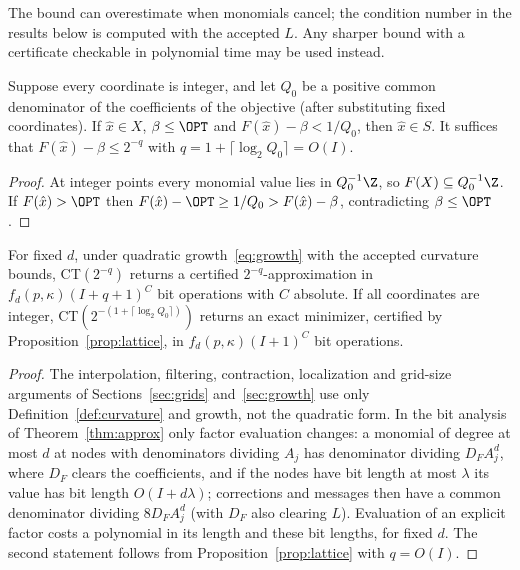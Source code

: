 The bound can overestimate when monomials cancel; the condition number in
the results below is computed with the accepted $L$. Any sharper bound with a
certificate checkable in polynomial time may be used instead.

\begin{proposition}\label{prop:lattice}
Suppose every coordinate is integer, and let $Q_0$ be a positive common
denominator of the coefficients of the objective (after substituting fixed
coordinates). If $\hat x\in X$, $\beta\le\OPT$ and
$F(\hat x)-\beta<1/Q_0$, then $\hat x\in S$. It suffices that
$F(\hat x)-\beta\le2^{-q}$ with $q=1+\lceil\log_2Q_0\rceil=O(I)$.
\end{proposition}

\begin{proof}
At integer points every monomial value lies in $Q_0^{-1}\Z$, so
$F(X)\subseteq Q_0^{-1}\Z$. If $F(\hat x)>\OPT$ then
$F(\hat x)-\OPT\ge1/Q_0>F(\hat x)-\beta$, contradicting $\beta\le\OPT$.
\end{proof}

\begin{corollary}\label{cor:poly}
For fixed $d$, under quadratic growth~\eqref{eq:growth} with the accepted
curvature bounds, CT$(2^{-q})$ returns a certified $2^{-q}$-approximation in
$f_d(p,\kappa)(I+q+1)^{C}$ bit operations with $C$ absolute. If all
coordinates are integer, CT$(2^{-(1+\lceil\log_2Q_0\rceil)})$ returns an exact
minimizer, certified by Proposition~\ref{prop:lattice}, in
$f_d(p,\kappa)(I+1)^C$ bit operations.
\end{corollary}

\begin{proof}
The interpolation, filtering, contraction, localization and grid-size
arguments of Sections~\ref{sec:grids} and~\ref{sec:growth} use only
Definition~\ref{def:curvature} and growth, not the quadratic form. In the bit
analysis of Theorem~\ref{thm:approx} only factor evaluation changes: a
monomial of degree at most $d$ at nodes with denominators dividing $A_j$ has
denominator dividing $D_FA_j^d$, where $D_F$ clears the coefficients, and
if the nodes have bit length at most $\lambda$ its value has bit length
$O(I+d\lambda)$; corrections and
messages then have a common denominator dividing $8D_FA_j^{d}$ (with $D_F$
also clearing $L$). Evaluation of an explicit factor costs a polynomial in
its length and these bit lengths, for fixed $d$. The second statement
follows from Proposition~\ref{prop:lattice} with $q=O(I)$.
\end{proof}

